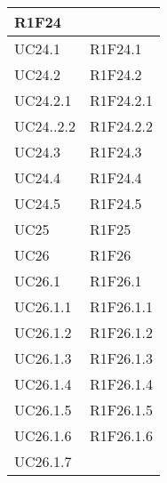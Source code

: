 \begin{center}
\begin{longtable}{|p{44mm}|p{22mm}|}
R1F24 \newline
\\
\hline
UC24.1 &

R1F24.1 \newline
\\
\hline
UC24.2 &

R1F24.2 \newline
\\
\hline
UC24.2.1 &

R1F24.2.1 \newline
\\
\hline
UC24..2.2 &

R1F24.2.2 \newline
\\
\hline
UC24.3 &

R1F24.3 \newline
\\
\hline
UC24.4 &

R1F24.4 \newline
\\
\hline
UC24.5 &

R1F24.5 \newline
\\
\hline
UC25 &

R1F25 \newline
\\
\hline
UC26 &

R1F26 \newline
\\
\hline
UC26.1 &

R1F26.1 \newline
\\
\hline
UC26.1.1 &

R1F26.1.1 \newline
\\
\hline
UC26.1.2 &

R1F26.1.2 \newline
\\
\hline
UC26.1.3 &

R1F26.1.3 \newline
\\
\hline
UC26.1.4 &

R1F26.1.4 \newline
\\
\hline
UC26.1.5 &

R1F26.1.5 \newline
\\
\hline
UC26.1.6 &

R1F26.1.6 \newline
\\
\hline
UC26.1.7 &


\end{longtable}
\end{center}

